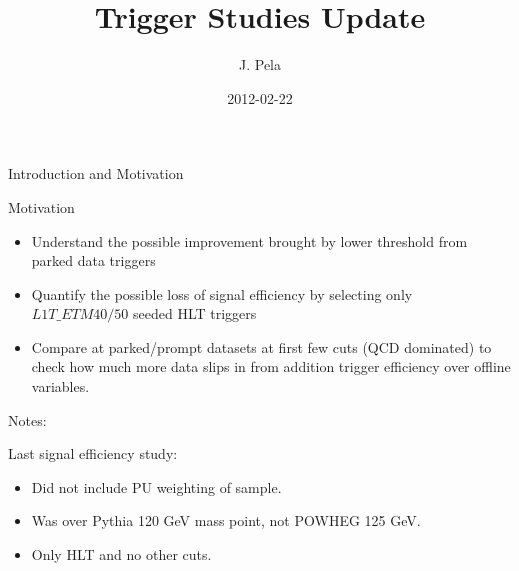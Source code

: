 \documentclass[8pt]{beamer}
\author[João Pela]{J. Pela}
\title[]{Trigger Studies Update}
\institute{Imperial College London}
\date{2012-02-22}
\begin{document}
\setlength{\unitlength}{1mm}

\begin{frame}
  \titlepage
\end{frame}

\begin{frame}{Introduction and Motivation}

\begin{block}{Motivation}

  \begin{itemize}
    \item Understand the possible improvement brought by lower threshold from parked data triggers
    \item Quantify the possible loss of signal efficiency by selecting only $L1T\_ETM{40/50}$ seeded HLT triggers
    \item Compare at parked/prompt datasets at first few cuts (QCD dominated) to check how much more data slips in from addition trigger efficiency
          over offline variables.
  \end{itemize}
  
\end{block}

\begin{block}{Notes:}

  Last signal efficiency study:
  \begin{itemize}
    \item Did not include PU weighting of sample.
    \item Was over Pythia 120 GeV mass point, not POWHEG 125 GeV.
    \item Only HLT and no other cuts.
  \end{itemize}
  
\end{block}

\end{frame}
\end{document}
